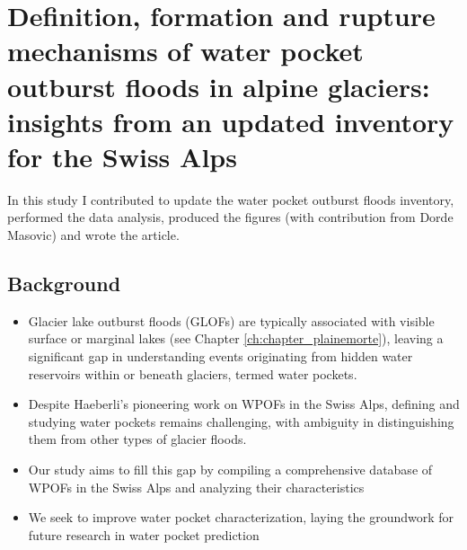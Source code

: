 \chapter{Definition, formation and rupture mechanisms of water pocket outburst floods in alpine glaciers: insights from an updated inventory for the Swiss Alps}
\label{ch:chapter_WPOFs}

In this study I contributed to update the water pocket outburst floods inventory, performed the data analysis, produced the figures (with contribution from Dorde Masovic) and wrote the article. 

\section{Background}

\begin{itemize}


        \item  Glacier lake outburst floods (GLOFs) are typically associated with visible surface or marginal lakes (see Chapter \ref{ch:chapter_plainemorte}), leaving a significant gap in understanding events originating from hidden water reservoirs within or beneath glaciers, termed water pockets.

        \item Despite Haeberli's pioneering work on WPOFs in the Swiss Alps, defining and studying water pockets remains challenging, with ambiguity in distinguishing them from other types of glacier floods.

        \item Our study aims to fill this gap by compiling a comprehensive database of WPOFs in the Swiss Alps and analyzing their characteristics

        \item We seek to improve water pocket characterization, laying the groundwork for future research in water pocket prediction

    \end{itemize}